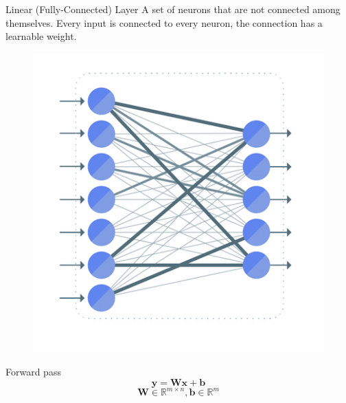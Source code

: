 \documentclass{beamer}
\begin{document}
\begin{frame}{Linear (Fully-Connected) Layer}
    A set of neurons that are not connected among themselves. Every input is connected to every neuron, the connection has a learnable weight.

    \vfill

    \begin{minipage}{0.45\textwidth}
        \begin{figure}
            \centering
            \includegraphics[width=\textwidth]{./images/13_linear_layer.png}
        \end{figure}
    \end{minipage}
    \hfill
    \begin{minipage}{0.45\textwidth}
        \begin{block}{Forward pass}
            $$
                \boldsymbol{y} = \boldsymbol{W}\boldsymbol{x} + \boldsymbol{b}
            $$
            $$
                \boldsymbol{W} \in \mathbb{R}^{m \times n}, \boldsymbol{b} \in \mathbb{R}^m
            $$
        \end{block}
    \end{minipage}
\end{frame}
\end{document}
